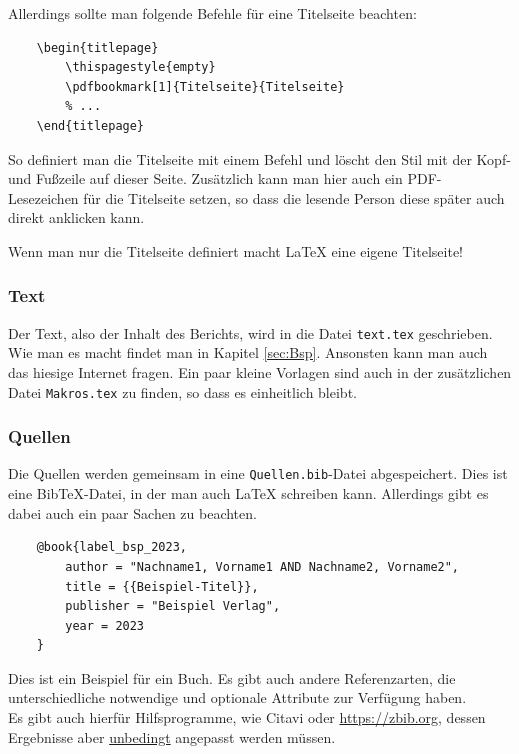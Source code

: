 Allerdings sollte man folgende Befehle für eine Titelseite beachten:

\begin{verbatim}
    \begin{titlepage}
        \thispagestyle{empty}
        \pdfbookmark[1]{Titelseite}{Titelseite}
        % ...
    \end{titlepage}
\end{verbatim}

So definiert man die Titelseite mit einem Befehl und löscht den Stil mit der Kopf- und Fußzeile auf dieser Seite. Zusätzlich kann man hier auch ein PDF-Lesezeichen für die Titelseite setzen, so dass die lesende Person diese später auch direkt anklicken kann.

\textcolor{red1}{Wenn man nur die Titelseite definiert macht \LaTeX{} eine eigene Titelseite!}


\subsubsection{Text}

Der Text, also der Inhalt des Berichts, wird in die Datei \verb|text.tex| geschrieben. Wie man es macht findet man in Kapitel \ref{sec:Bsp}. Ansonsten kann man auch das hiesige Internet fragen. Ein paar kleine Vorlagen sind auch in der zusätzlichen Datei \verb|Makros.tex| zu finden, so dass es einheitlich bleibt.


\subsubsection{Quellen}

Die Quellen werden gemeinsam in eine \verb|Quellen.bib|-Datei abgespeichert. Dies ist eine BibTeX-Datei, in der man auch \LaTeX{} schreiben kann. Allerdings gibt es dabei auch ein paar Sachen zu beachten.

\begin{verbatim}
    @book{label_bsp_2023,
        author = "Nachname1, Vorname1 AND Nachname2, Vorname2",
        title = {{Beispiel-Titel}},
        publisher = "Beispiel Verlag",
        year = 2023
    }
\end{verbatim}

Dies ist ein Beispiel für ein Buch. Es gibt auch andere Referenzarten, die unterschiedliche notwendige und optionale Attribute zur Verfügung haben.\\

Es gibt auch hierfür Hilfsprogramme, wie Citavi oder \url{https://zbib.org}, dessen Ergebnisse aber \textcolor{red1}{\underline{unbedingt}} angepasst werden müssen.

